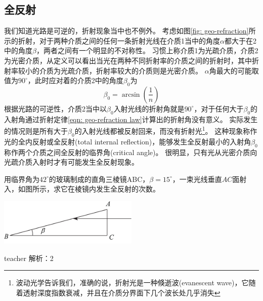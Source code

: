 \subsection{全反射}
我们知道光路是可逆的，折射现象当中也不例外。
考虑如图\ref{fig: geo-refraction}所示的折射，对于两种介质之间的任何一条折射光线在介质1当中的角度$\alpha$都大于在2中的角度$\beta$，两者之间有一个明显的不对称性。
习惯上称介质1为光疏介质，介质2为光密介质，从定义可以看出当光在两种不同折射率的介质之间的折射时，其中折射率较小的介质为光疏介质，折射率较大的介质则是光密介质。
$\alpha$角最大的可能取值为$90^\circ$，此时应对着的介质2中的角度$\beta_0$为
\begin{equation}
\beta_0 = \arcsin\left (\frac{1}{n}\right )
\end{equation}
根据光路的可逆性，介质2当中以$\beta_0$入射光线的折射角就是$90^\circ$，对于任何大于$\beta_0$的入射角通过折射定律\ref{eqn: geo-refraction law}计算出的折射角没有意义。
实际发生的情况则是所有大于$\beta_0$的入射光线都被反射回来，而没有折射光\footnote{波动光学告诉我们，准确的说，折射光是一种{\heiti 倏逝波}(evanescent wave)，它随着透射深度指数衰减，并且在介质分界面下几个波长处几乎消失}。
这种现象称作光的全内反射或{\heiti 全反射}(total internal reflection)，能够发生全反射最小的入射角$\beta_0$称作两个介质之间全反射的{\heiti 临界角}(critical angle)。
很明显，只有光从光密介质向光疏介质入射时才有可能发生全反射现象。

\begin{example}
用临界角为$42^\circ$的玻璃制成的直角三棱镜ABC，$\beta=15^\circ$，一束光线垂直$AC$面射入，如图所示，求它在棱镜内发生全反射的次数。
	\begin{flushright}
		\includegraphics[width = 0.5\textwidth]{images/opt-6.pdf} 
	\end{flushright}

\begin{taggedblock}{teacher}
\noindent
解析：2
\end{taggedblock}
\end{example}




